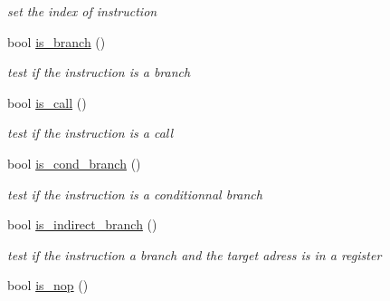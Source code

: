 \begin{DoxyCompactItemize}
\begin{DoxyCompactList}\small\item\em set the index of instruction \end{DoxyCompactList}\item 
\hypertarget{class_instruction_aab8e6a16b8bab5ca90b554086cc3c825}{bool \hyperlink{class_instruction_aab8e6a16b8bab5ca90b554086cc3c825}{is\+\_\+branch} ()}\label{class_instruction_aab8e6a16b8bab5ca90b554086cc3c825}

\begin{DoxyCompactList}\small\item\em test if the instruction is a branch \end{DoxyCompactList}\item 
\hypertarget{class_instruction_ab2a6352a09271a588f6930852a361f67}{bool \hyperlink{class_instruction_ab2a6352a09271a588f6930852a361f67}{is\+\_\+call} ()}\label{class_instruction_ab2a6352a09271a588f6930852a361f67}

\begin{DoxyCompactList}\small\item\em test if the instruction is a call \end{DoxyCompactList}\item 
\hypertarget{class_instruction_a1b607074554bc160142786c125bde530}{bool \hyperlink{class_instruction_a1b607074554bc160142786c125bde530}{is\+\_\+cond\+\_\+branch} ()}\label{class_instruction_a1b607074554bc160142786c125bde530}

\begin{DoxyCompactList}\small\item\em test if the instruction is a conditionnal branch \end{DoxyCompactList}\item 
\hypertarget{class_instruction_affdf2382cd36277fb4427cd3b07c1402}{bool \hyperlink{class_instruction_affdf2382cd36277fb4427cd3b07c1402}{is\+\_\+indirect\+\_\+branch} ()}\label{class_instruction_affdf2382cd36277fb4427cd3b07c1402}

\begin{DoxyCompactList}\small\item\em test if the instruction a branch and the target adress is in a register \end{DoxyCompactList}\item 
\hypertarget{class_instruction_a2222ad40481088c12a38c5f340bcd86b}{bool \hyperlink{class_instruction_a2222ad40481088c12a38c5f340bcd86b}{is\+\_\+nop} ()}\label{class_instruction_a2222ad40481088c12a38c5f340bcd86b}


\end{DoxyCompactItemize}
